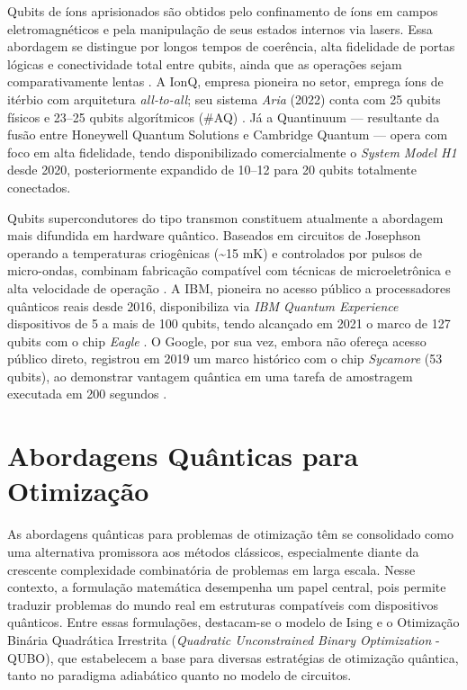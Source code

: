 Qubits de íons aprisionados são obtidos pelo confinamento de íons em campos eletromagnéticos e pela manipulação de seus estados internos via lasers. Essa abordagem se distingue por longos tempos de coerência, alta fidelidade de portas lógicas e conectividade total entre qubits, ainda que as operações sejam comparativamente lentas \cite{bruzewicz_trapped-ion_2019}. A IonQ, empresa pioneira no setor, emprega íons de itérbio com arquitetura \textit{all-to-all}; seu sistema \textit{Aria} (2022) conta com 25 qubits físicos e 23–25 qubits algorítmicos (\#AQ) \cite{ionq2022}. Já a Quantinuum — resultante da fusão entre Honeywell Quantum Solutions e Cambridge Quantum — opera com foco em alta fidelidade, tendo disponibilizado comercialmente o \textit{System Model H1} \cite{quantinuum2022} desde 2020, posteriormente expandido de 10–12 para 20 qubits totalmente conectados.

Qubits supercondutores do tipo transmon constituem atualmente a abordagem mais difundida em hardware quântico. Baseados em circuitos de Josephson operando a temperaturas criogênicas (\textasciitilde 15 mK) e controlados por pulsos de micro-ondas, combinam fabricação compatível com técnicas de microeletrônica e alta velocidade de operação \cite{koch2007charge}. A IBM, pioneira no acesso público a processadores quânticos reais desde 2016, disponibiliza via \textit{IBM Quantum Experience} dispositivos de 5 a mais de 100 qubits, tendo alcançado em 2021 o marco de 127 qubits com o chip \textit{Eagle} \cite{ibm2022quantumEagle}. O Google, por sua vez, embora não ofereça acesso público direto, registrou em 2019 um marco histórico com o chip \textit{Sycamore} (53 qubits), ao demonstrar vantagem quântica em uma tarefa de amostragem executada em 200 segundos \cite{arute_quantum_2019}.

\section{Abordagens Quânticas para Otimização}

As abordagens quânticas para problemas de otimização têm se consolidado como uma alternativa promissora aos métodos clássicos, especialmente diante da crescente complexidade combinatória de problemas em larga escala. Nesse contexto, a formulação matemática desempenha um papel central, pois permite traduzir problemas do mundo real em estruturas compatíveis com dispositivos quânticos. Entre essas formulações, destacam-se o modelo de Ising e o Otimização Binária Quadrática Irrestrita (\textit{Quadratic Unconstrained Binary Optimization} - QUBO), que estabelecem a base para diversas estratégias de otimização quântica, tanto no paradigma adiabático quanto no modelo de circuitos.


